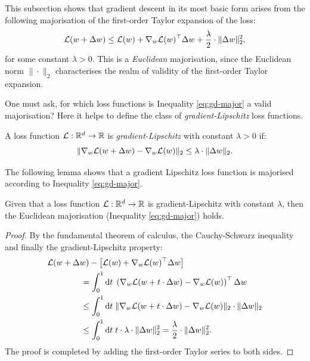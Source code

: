 \begin{refsection}
This subsection shows that gradient descent in its most basic form arises from the following majorisation of the first-order Taylor expansion of the loss:
\begin{equation}\label{eq:gd-major}
    \mathcal{L}(w+\Delta w) \leq \mathcal{L}(w) + \nabla_w \mathcal{L}(w)^\top \Delta w + \frac{\lambda}{2}\cdot \Vert {\Delta w} \Vert_2^2,
\end{equation}
for some constant $\lambda>0$. This is a \textit{Euclidean} majorisation, since the Euclidean norm $\|\cdot\|_2$ characterises the realm of validity of the first-order Taylor expansion.

One must ask, for which loss functions is Inequality \ref{eq:gd-major} a valid majorisation? Here it helps to define the class of \textit{gradient-Lipschitz} loss functions.
\begin{definition} A loss function $\mathcal{L}:\mathbb{R}^d\to\mathbb{R}$ is \textit{gradient-Lipschitz} with constant $\lambda>0$ if:
\begin{equation}
    \Vert {\nabla_w\mathcal{L}(w+\Delta w) - \nabla_w\mathcal{L}(w)} \Vert_2 \leq \lambda\cdot\Vert {\Delta w} \Vert_2.
\end{equation}
\end{definition}

The following lemma shows that a gradient Lipschitz loss function is majorised according to Inequality \ref{eq:gd-major}.
\begin{lemma}\label{lem:g-lipsch-major} Given that a loss function $\mathcal{L}:\mathbb{R}^d \to \mathbb{R}$ is gradient-Lipschitz with constant $\lambda$, then the Euclidean majorisation (Inequality \ref{eq:gd-major}) holds.
\end{lemma}
\begin{proof} By the fundamental theorem of calculus, the Cauchy-Schwarz inequality and finally the gradient-Lipschitz property:
\begin{align*}
    &\mathcal{L}(w+\Delta w) - \left[\mathcal{L}(w) + \nabla_w \mathcal{L}(w)^\top \Delta w\right]\\ &\qquad\qquad= \int_0^1\mathrm{d}{t}\; \left(\nabla_w \mathcal{L}(w+t\cdot \Delta w)-\nabla_w\mathcal{L}(w)\right)^\top\Delta w\\
    &\qquad\qquad\leq \int_0^1\mathrm{d}{t}\; \Vert {\nabla_w \mathcal{L}(w+t\cdot \Delta w)-\nabla_w\mathcal{L}(w)} \Vert_2\cdot\Vert {\Delta w} \Vert_2\\
    &\qquad\qquad \leq \int_0^1\mathrm{d}{t}\; t \cdot \lambda \cdot \Vert {\Delta w} \Vert_2^2 = \frac{\lambda}{2}\cdot\Vert {\Delta w} \Vert_2^2.
\end{align*}
The proof is completed by adding the first-order Taylor series to both sides.
\end{proof}


\end{refsection}
